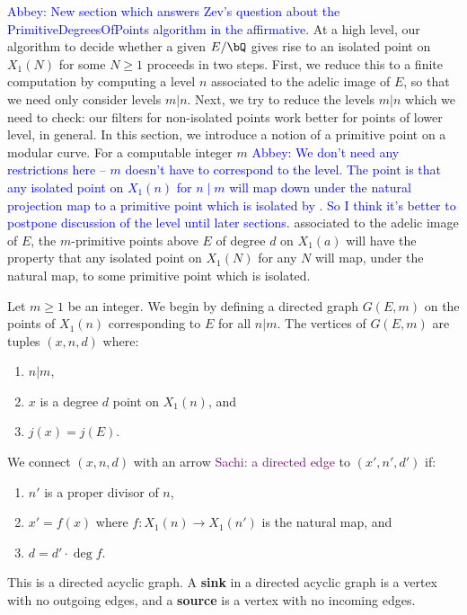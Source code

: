 \documentclass[11pt,reqno]{amsart}
\theoremstyle{plain}
\theoremstyle{definition}
\newcommand{\Q}{\bQ}
\newcommand{\abbey}[1]{\textcolor{blue}{Abbey: #1}}
\newcommand{\sachi}[1]{\textcolor{purple}{Sachi: #1}}
\newcommand{\abedit}[1]{{\color{blue} #1}}
\begin{document}
\abbey{New section which answers Zev's question about the PrimitiveDegreesOfPoints algorithm in the affirmative.}
At a high level, our algorithm to decide whether a given $E/\Q$ gives rise to an isolated point on $X_1(N)$ for some $N\geq 1$ proceeds in two steps. First, we reduce this to a finite computation by computing a level $n$ associated to the adelic image of $E$, so that we need only consider levels $m|n$. Next, we try to reduce the  levels $m|n$ which we need to check: our filters for non-isolated points work better for points of lower level, in general. In this section, we introduce a notion of a primitive point on a modular curve. 
For a computable integer $m$ \abbey{We don't need any restrictions here -- $m$ doesn't have to correspond to the level. The point is that any isolated point on $X_1(n)$ for $n \mid m$ will map down under the natural projection map to a primitive point which is isolated by \cite[Theorem 4.3]{BELOV}. So I think it's better to postpone discussion of the level until later sections.} associated to the adelic image of $E$, the $m$-primitive points above $E$ of degree $d$ on $X_1(a)$ will have the property that any isolated point on $X_1(N)$ for any $N$ will map, under the natural map, to some primitive  point \abedit{which is isolated}. 

Let $m\geq 1$ be an integer. 
We begin by defining a directed graph $G(E,m)$ on the points of $X_1(n)$ corresponding to $E$ for all $n|m$. The vertices of $G(E,m)$ are tuples $(x,n,d)$ where:
\begin{enumerate}
    \item $n|m$,
    \item $x$ is a degree $d$ point on $X_1(n)$, and 
    \item $j(x)=j(E)$.
\end{enumerate}
We connect $(x,n,d)$ with an arrow \sachi{a directed edge} to $(x',n',d')$ if: 
\begin{enumerate}
    \item $n'$ is a proper divisor of $n$,
    \item $x'=f(x)$ where $f\colon X_1(n)\to X_1(n')$ is the natural map, and
    \item $d=d'\cdot \deg f$.
\end{enumerate}


This is a directed acyclic graph. A \textbf{sink} in a directed acyclic graph is a vertex with no outgoing edges, and a \textbf{source} is a vertex with no incoming edges. 
\end{document}
